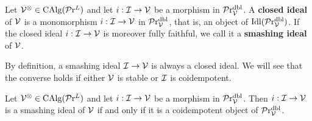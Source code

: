 \documentclass[10pt,a4paper,oneside]{article}
\begin{document}
\begin{de}
Let $\votimes\in \calg(\prl)$ and let $i:\mci\to \mcv$ be a morphism in $\linvdbl$. A \textbf{closed ideal} of $\mcv$ is a monomorphism $i:\mci\to \mcv$ in $\linvdbl$, that is, an object of $\idl(\linvdbl)$. If the closed ideal $i:\mci\to \mcv$ is moreover fully faithful, we call it a \textbf{smashing ideal} of $\mcv$.
\end{de}

\begin{rem}
By definition, a smashing ideal $\mci\to \mcv$ is always a closed ideal. We will see that the converse holds if either $\mcv$ is stable or $\mci$ is coidempotent.
\end{rem}


\begin{thm}\label{smideal}
Let $\votimes\in \calg(\prl)$ and let $i:\mci\to \mcv$ be a morphism in $\linvdbl$. Then $i:\mci\to \mcv$ is a smashing ideal of $\mcv$ if and only if it is a coidempotent object of $\linvdbl$.
\end{thm}
\end{document}
